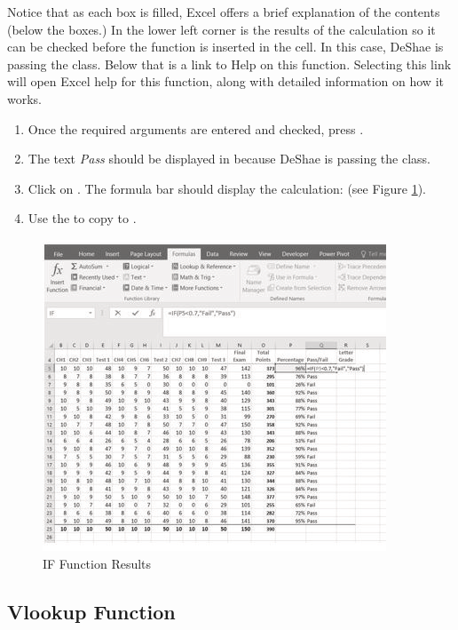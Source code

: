 Notice that as each box is filled, Excel offers a brief explanation of the contents (below the boxes.) In the lower left corner is the results of the calculation so it can be checked before the function is inserted in the cell. In this case, DeShae is passing the class. Below that is a link to Help on this function. Selecting this link will open Excel help for this function, along with detailed information on how it works.

\begin{enumerate}[resume]
	\item Once the required arguments are entered and checked, press . 
	\item The text \textit{Pass} should be displayed in  because DeShae is passing the class.
	\item Click on . The formula bar should display the  calculation:  (see Figure \ref{03:fig11}).
	\item Use the  to copy  to .
\end{enumerate}

\begin{figure}[H]
	\centering
	\includegraphics[width=\maxwidth{.95\linewidth}]{gfx/ch03_fig11}
	\caption{IF Function Results}
	\label{03:fig11}
\end{figure}

\subsection{Vlookup Function}


